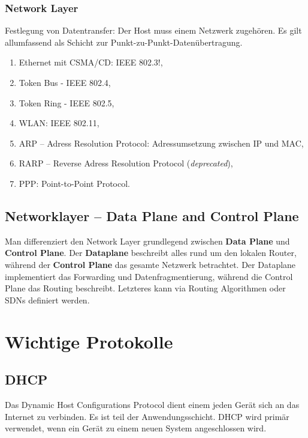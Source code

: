 \documentclass{scrartcl}
\begin{document}
    \subsubsection{Network Layer}
    \label{subsubsection:TCP_network_layer}
    Festlegung von Datentransfer: Der Host muss einem Netzwerk zugehören.
    Es gilt allumfassend als Schicht zur Punkt-zu-Punkt-Datenübertragung.
    \begin{enumerate}
        \item Ethernet mit CSMA/CD: IEEE 802.3!,
        \item Token Bus - IEEE 802.4,
        \item Token Ring - IEEE 802.5,
        \item WLAN: IEEE 802.11,
        \item ARP -- Adress Resolution Protocol: Adressumsetzung zwischen IP und MAC,
        \item RARP -- Reverse Adress Resolution Protocol (\emph{deprecated}),
        \item PPP: Point-to-Point Protocol.
    \end{enumerate}

    \subsection{Networklayer -- Data Plane and Control Plane}
    \label{subsection:data_plane_and_control_plane}
    Man differenziert den Network Layer grundlegend zwischen \textbf{Data Plane} und \textbf{Control Plane}.
    Der \textbf{Dataplane} beschreibt alles rund um den lokalen Router, 
    während der \textbf{Control Plane} das gesamte Netzwerk betrachtet.
    Der Dataplane implementiert das Forwarding und Datenfragmentierung, 
    während die Control Plane das Routing beschreibt. 
    Letzteres kann via Routing Algorithmen oder SDNs definiert werden.
    
\section{Wichtige Protokolle}   
    \subsection{DHCP}
    \label{subsection:protocols_dhcp}
    Das Dynamic Host Configurations Protocol dient einem jeden Gerät sich an das Internet zu verbinden. 
    Es ist teil der Anwendungsschicht. 
    DHCP wird primär verwendet, wenn ein Gerät zu einem neuen System angeschlossen wird.
    
\end{document}
